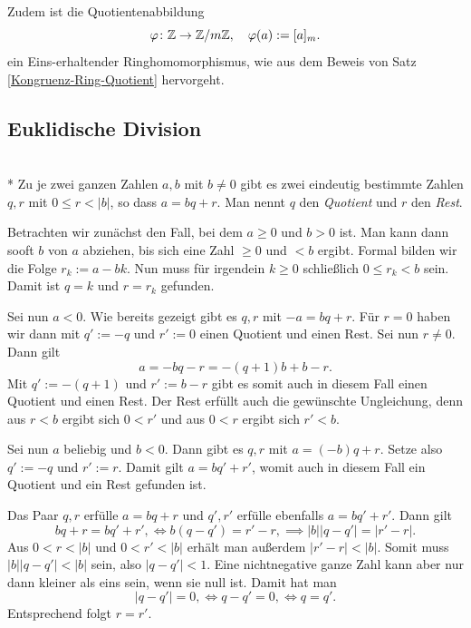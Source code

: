 \noindent
Zudem ist die Quotientenabbildung
\[\varphi\colon\mathbb Z \to \mathbb Z/m\mathbb Z,\quad \varphi(a):=[a]_m.\]
ein Eins-erhaltender Ringhomomorphismus, wie aus dem Beweis
von Satz \ref{Kongruenz-Ring-Quotient} hervorgeht.

\subsection{Euklidische Division}

\begin{Satz}\mbox{}\\*
Zu je zwei ganzen Zahlen $a,b$ mit $b\ne 0$ gibt es zwei eindeutig
bestimmte Zahlen $q,r$ mit $0\le r<|b|$, so dass $a=bq+r$. Man nennt
$q$ den \emph{Quotient} und $r$ den \emph{Rest}.
\end{Satz}
\begin{Beweis}
Betrachten wir zunächst den Fall, bei dem $a\ge 0$
und $b>0$ ist. Man kann dann sooft $b$ von $a$ abziehen, bis sich eine
Zahl $\ge 0$ und $<b$ ergibt. Formal bilden wir die
Folge $r_k := a-bk$. Nun muss für irgendein $k\ge 0$ schließlich
$0\le r_k<b$ sein. Damit ist $q=k$ und $r=r_k$ gefunden.

Sei nun $a<0$. Wie bereits gezeigt gibt es $q,r$ mit $-a = bq+r$.
Für $r=0$ haben wir dann mit $q':=-q$ und $r':=0$ einen Quotient
und einen Rest. Sei nun $r\ne 0$. Dann gilt
\[a = -bq-r = -(q+1)b + b - r.\]
Mit $q':=-(q+1)$ und $r':=b-r$ gibt es somit auch in diesem Fall einen
Quotient und einen Rest. Der Rest erfüllt auch die gewünschte
Ungleichung, denn aus $r<b$ ergibt sich $0<r'$ und aus $0<r$ ergibt
sich $r'<b$.

Sei nun $a$ beliebig und $b<0$. Dann gibt es $q,r$ mit $a=(-b)q+r$.
Setze also $q':=-q$ und $r':=r$. Damit gilt $a=bq'+r'$, womit
auch in diesem Fall ein Quotient und ein Rest gefunden ist.\,\qedsymbol
\end{Beweis}
\begin{Beweis}
Das Paar $q,r$ erfülle
$a=bq+r$ und $q',r'$ erfülle ebenfalls $a=bq'+r'$. Dann gilt
\[bq+r = bq'+r',\iff b(q-q') = r'-r,\implies |b| |q-q'| = |r'-r|.\]
Aus $0<r<|b|$ und $0<r'<|b|$ erhält man außerdem $|r'-r|<|b|$. Somit
muss $|b| |q-q'| < |b|$ sein, also $|q-q'| < 1$. Eine nichtnegative
ganze Zahl kann aber nur dann kleiner als eins sein, wenn sie null
ist. Damit hat man
\[|q-q'|=0,\iff q-q'=0,\iff q=q'.\]
Entsprechend folgt $r=r'$.\,\qedsymbol
\end{Beweis}

